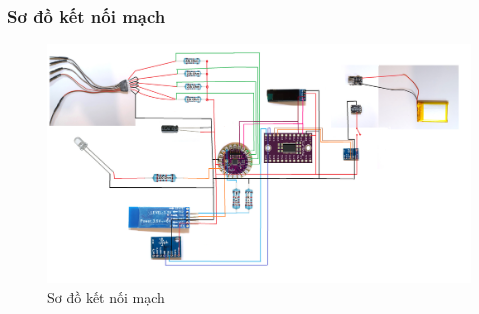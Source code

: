 \subsubsection{Sơ đồ kết nối mạch}

\begin{figure}[H]
    \centering
    \includegraphics[width=\textwidth,height=\textheight,keepaspectratio]{Images/SystemImpl/schematic.png}
    \caption{Sơ đồ kết nối mạch}
    \label{fig:enter-label}
\end{figure}

